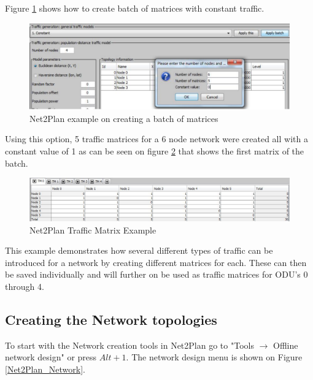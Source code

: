 	Figure \ref{TrafficMatrixCreation} shows how to create batch of matrices with constant traffic.
	
	\begin{figure}[h!]
		\centering
		\includegraphics[width = 13cm]{TrafficMatrixCreation.pdf}
		\caption{Net2Plan example on creating a batch of matrices }
		\label{TrafficMatrixCreation}
	\end{figure} 	
	
	Using this option, 5 traffic matrices for a 6 node network were created all with a constant value of 1 as can be seen on figure \ref{Net2Plan_matrix} that shows the first matrix of the batch.

	\begin{figure}[h!]
		\centering
		\includegraphics[width = 13cm]{Net2Plan_matrix.pdf}
		\caption{Net2Plan Traffic Matrix Example}
		\label{Net2Plan_matrix}
	\end{figure}
	
	This example demonstrates how several different types of traffic can be introduced for a network by creating different matrices for each. These can then be saved individually and will further on be used as traffic matrices for ODU's 0 through 4.
	
	\newpage
		
	\subsection{Creating the Network topologies} \label{Creating the Network topologies}
	To start with the Network creation tools in Net2Plan go to "Tools $\rightarrow$ Offline network design" or press $Alt+1$. The network design menu is shown on Figure \ref{Net2Plan_Network}.
	
